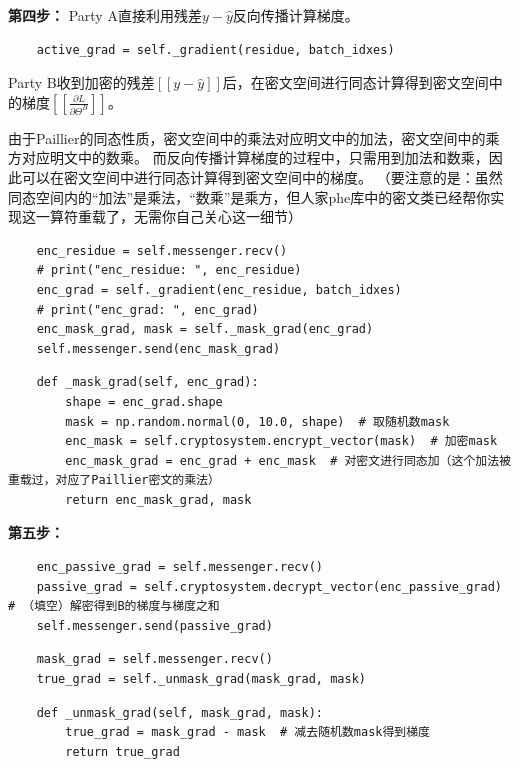 \documentclass[twoside,11pt]{article}
\begin{document}
\textbf{第四步：}
Party A直接利用残差$y-\hat{y}$反向传播计算梯度。
\begin{lstlisting}
    active_grad = self._gradient(residue, batch_idxes)
\end{lstlisting}

Party B收到加密的残差$[[ y-\hat{y} ]]$后，在密文空间进行同态计算得到密文空间中的梯度$[[\frac{\partial L}{\partial \Theta^B}]]$。

由于Paillier的同态性质，密文空间中的乘法对应明文中的加法，密文空间中的乘方对应明文中的数乘。
而反向传播计算梯度的过程中，只需用到加法和数乘，因此可以在密文空间中进行同态计算得到密文空间中的梯度。
（要注意的是：虽然同态空间内的“加法”是乘法，“数乘”是乘方，但人家phe库中的密文类已经帮你实现这一算符重载了，无需你自己关心这一细节）

\begin{lstlisting}
    enc_residue = self.messenger.recv()
    # print("enc_residue: ", enc_residue)
    enc_grad = self._gradient(enc_residue, batch_idxes)
    # print("enc_grad: ", enc_grad)
    enc_mask_grad, mask = self._mask_grad(enc_grad)
    self.messenger.send(enc_mask_grad)
\end{lstlisting}


\begin{lstlisting}
    def _mask_grad(self, enc_grad):
        shape = enc_grad.shape
        mask = np.random.normal(0, 10.0, shape)  # 取随机数mask
        enc_mask = self.cryptosystem.encrypt_vector(mask)  # 加密mask
        enc_mask_grad = enc_grad + enc_mask  # 对密文进行同态加（这个加法被重载过，对应了Paillier密文的乘法）
        return enc_mask_grad, mask
\end{lstlisting}

\textbf{第五步：}

\begin{lstlisting}
    enc_passive_grad = self.messenger.recv()
    passive_grad = self.cryptosystem.decrypt_vector(enc_passive_grad)  # （填空）解密得到B的梯度与梯度之和
    self.messenger.send(passive_grad)
\end{lstlisting}



\begin{lstlisting}
    mask_grad = self.messenger.recv()
    true_grad = self._unmask_grad(mask_grad, mask)
\end{lstlisting}


\begin{lstlisting}
    def _unmask_grad(self, mask_grad, mask):
        true_grad = mask_grad - mask  # 减去随机数mask得到梯度
        return true_grad
\end{lstlisting}
\end{document}
